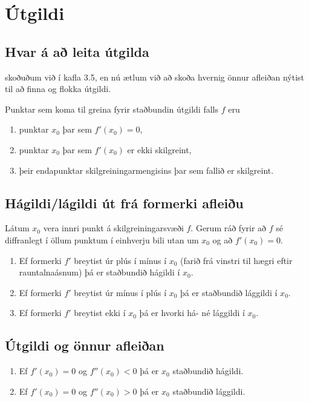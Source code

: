 \documentclass[b5paper,11pt,icelandic]{sphinxmanual}
\begin{document}
\section{Útgildi}
\label{kafli05:utgildi}\label{kafli05:index-3}

\subsection{Hvar á að leita útgilda}
\label{kafli05:hvar-a-a-leita-utgilda}
{\hyperref[kafli03:utgildi]{}}  skoðuðum við í kafla 3.5, en nú ætlum við að skoða
hvernig önnur afleiðan nýtist til að finna og flokka útgildi.

Punktar sem koma til greina fyrir staðbundin útgildi falls \(f\) eru
\begin{enumerate}
\item {} 
punktar \(x_0\) þar sem \(f'(x_0)=0\),

\item {} 
punktar \(x_0\) þar sem \(f'(x_0)\) er ekki skilgreint,

\item {} 
þeir endapunktar skilgreiningarmengisins þar sem fallið er
skilgreint.

\end{enumerate}


\subsection{Hágildi/lágildi út frá formerki afleiðu}
\label{kafli05:hagildi-lagildi-ut-fra-formerki-afleiu}
Látum \(x_0\) vera innri punkt á skilgreiningarsvæði \(f\).
Gerum ráð fyrir að \(f\) sé diffranlegt í öllum punktum í einhverju
bili utan um \(x_0\) og að \(f'(x_0)=0\).
\begin{enumerate}
\item {} 
Ef formerki \(f'\) breytist úr plús í mínus í \(x_0\)
(farið frá vinstri til hægri eftir rauntalnaásnum) þá er
staðbundið hágildi í \(x_0\).

\item {} 
Ef formerki \(f'\) breytist úr mínus í plús í \(x_0\) þá
er staðbundið lággildi í \(x_0\).

\item {} 
Ef formerki \(f'\) breytist ekki í \(x_0\) þá er hvorki
há- né lággildi í \(x_0\).

\end{enumerate}


\subsection{Útgildi og önnur afleiðan}
\label{kafli05:utgildi-og-onnur-afleian}\begin{enumerate}
\item {} 
Ef \(f'(x_0)=0\) og \(f''(x_0)<0\) þá er \(x_0\)
staðbundið hágildi.

\item {} 
Ef \(f'(x_0)=0\) og \(f''(x_0)>0\) þá er \(x_0\)
staðbundið lággildi.

\end{enumerate}
\end{document}
